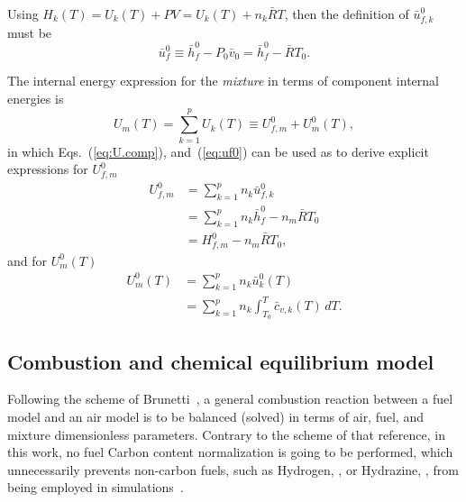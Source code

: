     Using $H_k(T) = U_k(T) + PV = U_k(T) + n_k\bar{R}T$, then the definition of $\bar{u}^0_{f,k}$ must be%
    \begin{equation}
        \bar{u}_f^0 \equiv \bar{h}_f^0 - P_0\bar{v}_0 = \bar{h}_f^0 - \bar{R}T_0.
        \label{eq:uf0}
    \end{equation}

    The internal energy expression for the \emph{mixture} in terms of component internal energies is%
    \begin{equation}
        U_m(T) = \sum_{k=1}^p U_k(T) \equiv U^0_{f,m} + U^0_m(T),
        \label{eq:U.mix}
    \end{equation}
    \noindent in which Eqs.~(\ref{eq:U.comp}), and~(\ref{eq:uf0}) can be used as to derive explicit expressions for $U^0_{f,m}$%
    \begin{align}
        U^0_{f,m}   &= \sum_{k=1}^p n_k\bar{u}^0_{f,k} \nonumber\\
                    &= \sum_{k=1}^p n_k\bar{h}_f^0 - n_m\bar{R}T_0 \nonumber\\
                    &= H^0_{f,m} - n_m\bar{R}T_0,
        \label{eq:Uf0.mix}
    \end{align}
    \noindent and for $U^0_m(T)$%
    \begin{align}
        U^0_m(T)    &= \sum_{k=1}^p n_k\bar{u}^0_k(T) \nonumber\\
                    &= \sum_{k=1}^p n_k \int_{T_0}^T \bar{c}_{v,k}(T)\,dT.
        \label{eq:U0.mix}
    \end{align}


    \subsection{Combustion and chemical equilibrium model}\label{sec:model.cchemm}

    Following the scheme of Brunetti~\cite{2012-BrunettiF-Blucher}, a general combustion reaction between a fuel  model  and  an
    air model is to be balanced (solved) in terms of air, fuel, and mixture dimensionless parameters. Contrary to the scheme  of
    that reference, in this work, no fuel Carbon content normalization is going to be performed,  which  unnecessarily  prevents
    non-carbon   fuels,   such   as   Hydrogen,    ,    or    Hydrazine,    ,    from    being    employed    in
    simulations~\cite{2018-SilvaRKO-UTFPR}.

